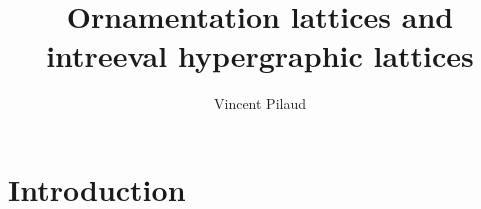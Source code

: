 \documentclass{amsart}
\title[Ornamentation lattices and intreeval hypergraphic lattices]{Ornamentation lattices and \\ intreeval hypergraphic lattices}
\author{Vincent Pilaud}
\theoremstyle{definition}
\begin{document}
\begin{abstract}
\end{abstract}

\maketitle

\tableofcontents


\pagebreak

\section{Introduction}
\label{sec:introduction}
\end{document}
